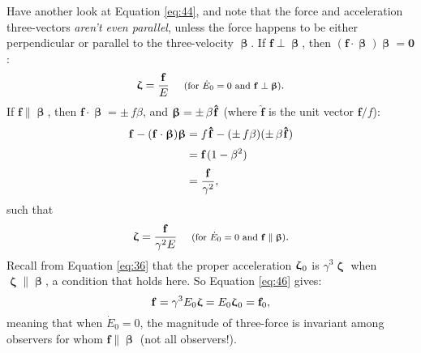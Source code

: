 \documentclass[12pt]{article}
\renewcommand{\vv}[1]{\mathbf{#1}}
\newcommand{\vvbeta}{\bm{\upbeta}}
\newcommand{\vvzeta}{\bm{\upzeta}}
\begin{document}
Have another look at Equation \ref{eq:44}, and note that the force and acceleration three-vectors \emph{aren't even parallel}, unless the force happens to be either perpendicular or parallel to the three-velocity $\vvbeta$. If $\vv f \perp \vvbeta$, then $(\vv f \cdot \vvbeta) \vvbeta = \vv 0$:
\begin{equation}\label{eq:45}
\vvzeta = \frac{\vv f}{E} \quad \textrm{\footnotesize{ (for $\dot{E}_0 = 0$ and $\vv f \perp \vvbeta$)}}.
\end{equation}
If $\vv f \parallel \vvbeta$, then $\vv f \cdot \vvbeta = \pm \, f \beta$, and $\vvbeta = \pm \, \beta \mkern1mu \vv{\hat{f}}$ (where $\vv{\hat{f}}$ is the unit vector $\vv f / f$):
\begin{equation*}
\begin{split}
\vv f - (\vv f \cdot \vvbeta) \vvbeta &= f \mkern1mu \vv{\hat{f}} - (\pm \, f \beta) (\pm \, \beta \mkern1mu \vv{\hat{f}}) \\[2pt]
&= \vv f \mkern1mu (1 - \beta^2) \\[2pt]
&= \frac{\vv f}{\gamma^2},
\end{split}
\end{equation*}
such that
\begin{equation}\label{eq:46}
\vvzeta = \frac{\vv f}{\gamma^2 E} \quad \textrm{\footnotesize{ (for $\dot{E}_0 = 0$ and $\vv f \parallel \vvbeta$)}}.
\end{equation}
Recall from Equation \ref{eq:36} that the proper acceleration $\vvzeta_{\mkern1mu 0}$ is $\gamma^3 \vvzeta$ when $\vvzeta \parallel \vvbeta$, a condition that holds here. So Equation \ref{eq:46} gives:
\begin{equation*}
\vv f = \gamma^3 E_0 \vvzeta = E_0 \vvzeta_{\mkern1mu 0} = \vv f_0 ,
\end{equation*}
meaning that when $\dot{E}_0 = 0$, the magnitude of three-force is invariant among observers for whom $\vv f \parallel \vvbeta$ (not all observers!).
\end{document}
